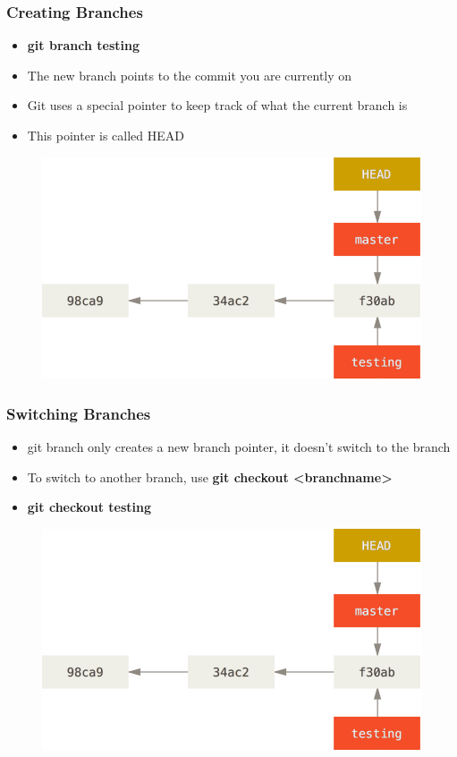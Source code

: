 \documentclass{beamer}
\begin{document}
\begin{frame}
	\frametitle{Creating Branches}
	\begin{itemize}
		\item{\textbf{git branch testing}}
		\item{The new branch points to the commit you are currently on}
		\item{Git uses a special pointer to keep track of what the current branch is}
		\item{This pointer is called HEAD}
	\end{itemize}
	\begin{figure}
		\includegraphics[scale=0.32]{Creating_Branches-1.png}
	\end{figure}
\end{frame}

\begin{frame}
	\frametitle{Switching Branches}
	\begin{itemize}
		\item{git branch only creates a new branch pointer, it doesn't switch to the branch}
		\item{To switch to another branch, use \textbf{git checkout \textless{}branchname\textgreater{}}}
		\item{\textbf{git checkout testing}}
	\end{itemize}
	\begin{figure}
		\includegraphics[scale=0.32]{Switching_Branches-0.png}
	\end{figure}
\end{frame}
\end{document}
